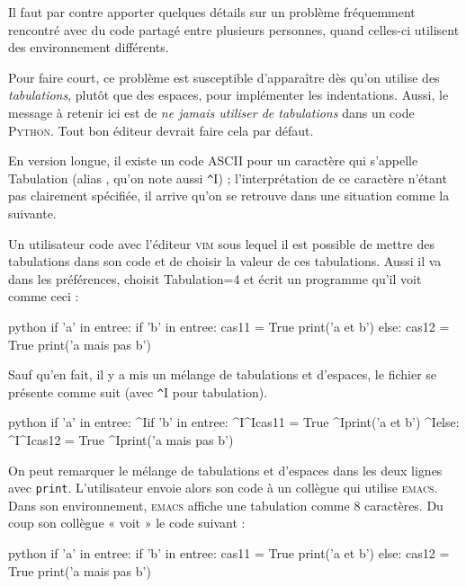 Il faut par contre apporter quelques détails sur un problème fréquemment rencontré avec du code partagé entre plusieurs personnes, quand celles-ci utilisent des environnement différents.

\begin{linewidthnote}
Pour faire court, ce problème est susceptible d'apparaître dès qu'on utilise des \emph{tabulations}, plutôt que des espaces, pour implémenter les indentations. Aussi, le message à retenir ici est de \emph{ne jamais utiliser de tabulations} dans un code \textsc{Python}. Tout bon éditeur devrait faire cela par défaut.
\end{linewidthnote}

En version longue, il existe un code ASCII pour un caractère qui s'appelle Tabulation (alias , qu'on note aussi \lstinline[basicstyle={\small\shellttfont}]{^}I) ; l'interprétation de ce caractère n'étant pas clairement spécifiée, il arrive qu'on se retrouve dans une situation comme la suivante.

Un utilisateur code avec l'éditeur \textsc{vim} sous lequel il est possible de mettre des tabulations dans son code et de choisir la valeur de ces tabulations. Aussi il va dans les préférences, choisit Tabulation=4 et écrit un programme qu'il voit comme ceci :

\begin{codebox}{python}
if 'a' in entree:
    if 'b' in entree:
        cas11 = True
        print('a et b')
    else:
        cas12 = True
        print('a mais pas b')
\end{codebox}

Sauf qu'en fait, il y a mis un mélange de tabulations et d'espaces, le fichier se présente comme suit (avec \lstinline[basicstyle={\small\shellttfont}]{^}I pour tabulation).

\begin{codebox}{python}
if 'a' in entree:
^Iif 'b' in entree:
^I^Icas11 = True
    ^Iprint('a et b')
^Ielse:
^I^Icas12 = True
    ^Iprint('a mais pas b')
\end{codebox}

On peut remarquer le mélange de tabulations et d'espaces dans les deux lignes avec \texttt{print}. L'utilisateur envoie alors son code à un collègue qui utilise \textsc{emacs}. Dans son environnement, \textsc{emacs} affiche une tabulation comme 8 caractères. Du coup son collègue « voit » le code suivant :

\begin{codebox}{python}
if 'a' in entree:
        if 'b' in entree:
                cas11 = True
            print('a et b')
        else:
                cas12 = True
            print('a mais pas b')
\end{codebox}

